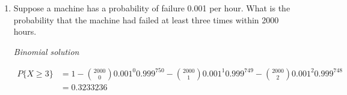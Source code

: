 \documentclass[]{book}
\providecommand{\tightlist}{%
  \setlength{\itemsep}{0pt}\setlength{\parskip}{0pt}}
\theoremstyle{definition}
\theoremstyle{definition}
\theoremstyle{definition}
\theoremstyle{remark}
\begin{document}
\begin{enumerate}
  \begin{enumerate}
  \def\labelenumii{\alph{enumii})}
  \tightlist
  \item
    What is the maximum amount of money he can get?
  \item
    What is the expected earnings of the player?
  \item
    What is the variance of his earnings?
  \end{enumerate}

  \emph{Solution:}

  \begin{enumerate}
  \def\labelenumii{\alph{enumii})}
  \item
    10 out of 10 means 10\^{}2 = 100.
  \item
    \(g(X = x) = x^2\) if \(x \geq 7\), \(-x\) else,
    \(f(g(X) = x^2) = f(X = x) = \binom{10}{x} 0.15^x * 0.85^(10-k)\),
    so \(E[g(x)] = \sum_{i=0}^10 g(x)f(x)\).

    So
    \(49 * \binom{10}{7} 0.15^7 * 0.85^3 + 64 * \binom{10}{8} 0.15^8 * 0.85^2 + 81 * \binom{10}{9} 0.15^9 * 0.85 + 100 * (0.15)^10\)
    \(-20 * \binom{10}{6} 0.15^6 * 0.85^4 -25 * \binom{10}{5} 0.15^5 * 0.85^5 - 30 * \binom{10}{4} 0.15^4 * 0.85^6 - 35 * \binom{10}{3} 0.15^3 * 0.85^7 - 40 * \binom{10}{2} 0.15^2 * 0.85^8 - 45 * \binom{10}{1} 0.15^1 * 0.85^9 - 50 * 0.85^10 = -42.5TL\).
  \end{enumerate}

\begin{verbatim}
## [1] -42.4913
\end{verbatim}

  \begin{enumerate}
  \def\labelenumii{\alph{enumii})}
  \setcounter{enumii}{2}
  \tightlist
  \item
    \(V(X) = E[X^2] - (E[X])^2\). We know that \(E[X] = -42.5\), then
    \((E[X])^2 = 1805.51\). Also \(E[X^2] = 1838.434\) and
    \(V(X) = 32.92\).
  \end{enumerate}

\begin{verbatim}
## [1] 32.92423
\end{verbatim}
\item
  Suppose a machine has a probability of failure 0.001 per hour. What is
  the probability that the machine had failed at least three times
  within 2000 hours.

  \emph{Binomial solution}

  \begin{align*}
   P\{X \ge 3\} &= 1 - \binom{2000}{0} 0.001^0 0.999^{750} - \binom{2000}{1} 0.001^1 0.999^{749} - \binom{2000}{2} 0.001^2 0.999^{748} \\
   &= 0.3233236
   \end{align*}


\end{enumerate}
\end{document}
